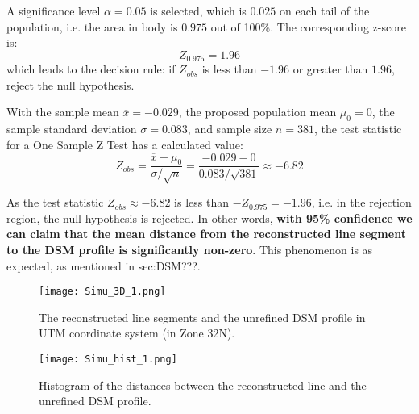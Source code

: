 A significance level $\alpha=0.05$ is selected, which is $0.025$ on each tail of the population, i.e. the area in body is $0.975$ out of 100\%. The corresponding z-score is:
\begin{equation*}
Z_{0.975}=1.96
\end{equation*}
which leads to the decision rule: if $Z_{obs}$ is less than $-1.96$ or greater than $1.96$, reject the null hypothesis.

With the sample mean $\overline{x}=-0.029$,
the proposed population mean $\mu_0=0$,
the sample standard deviation $\sigma=0.083$,
and sample size $n=381$, the test statistic for a One Sample Z Test has a calculated value:
\begin{equation*}
Z_{obs} = \frac{\overline{x}-\mu_0}{\sigma/\sqrt{n}}=\frac{-0.029-0}{0.083/\sqrt{381}}\approx-6.82
\end{equation*}

As the test statistic $Z_{obs}\approx-6.82$ is less than $-Z_{0.975}=-1.96$, i.e. in the rejection region, the null hypothesis is rejected. In other words, \textbf{with 95\% confidence we can claim that the mean distance from the reconstructed line segment to the DSM profile is significantly non-zero}. This phenomenon is as expected, as mentioned in sec:DSM???. 


\begin{figure}
  \centering
  \texttt{[image: Simu\_3D\_1.png]} %
  \caption{\small The reconstructed line segments and the unrefined DSM profile in UTM coordinate system (in Zone 32N).}
  \label{fig:Simu3D_1}
  \vspace{1cm}
  \texttt{[image: Simu\_hist\_1.png]}
  \caption{\small Histogram of the distances between the reconstructed line and the unrefined DSM profile.}
  \label{fig:SimuHist_1}
\end{figure}

\clearpage


 


